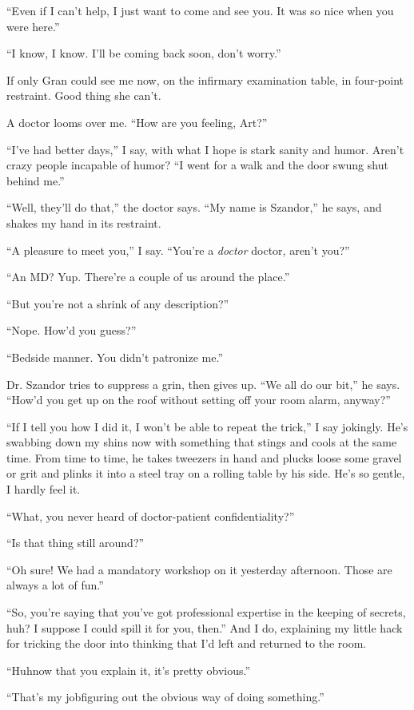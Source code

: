 “Even if I can’t help, I just want to come and see you. It was so
nice when you were here.”

“I know, I know. I’ll be coming back soon, don’t worry.”

If only Gran could see me now, on the infirmary examination table,
in four-point restraint. Good thing she can’t.

A doctor looms over me. “How are you feeling, Art?”

“I’ve had better days,” I say, with what I hope is stark sanity and
humor. Aren’t crazy people incapable of humor? “I went for a walk
and the door swung shut behind me.”

“Well, they’ll do that,” the doctor says. “My name is Szandor,” he
says, and shakes my hand in its restraint.

“A pleasure to meet you,” I say. “You’re a \emph{doctor} doctor,
aren’t you?”

“An MD? Yup. There’re a couple of us around the place.”

“But you’re not a shrink of any description?”

“Nope. How’d you guess?”

“Bedside manner. You didn’t patronize me.”

Dr. Szandor tries to suppress a grin, then gives up. “We all do our
bit,” he says. “How’d you get up on the roof without setting off
your room alarm, anyway?”

“If I tell you how I did it, I won’t be able to repeat the trick,”
I say jokingly. He’s swabbing down my shins now with something that
stings and cools at the same time. From time to time, he takes
tweezers in hand and plucks loose some gravel or grit and plinks it
into a steel tray on a rolling table by his side. He’s so gentle, I
hardly feel it.

“What, you never heard of doctor-patient confidentiality?”

“Is that thing still around?”

“Oh sure! We had a mandatory workshop on it yesterday afternoon.
Those are always a lot of fun.”

“So, you’re saying that you’ve got professional expertise in the
keeping of secrets, huh? I suppose I could spill it for you, then.”
And I do, explaining my little hack for tricking the door into
thinking that I’d left and returned to the room.

“Huh{\dash}now that you explain it, it’s pretty obvious.”

“That’s my job{\dash}figuring out the obvious way of doing something.”

